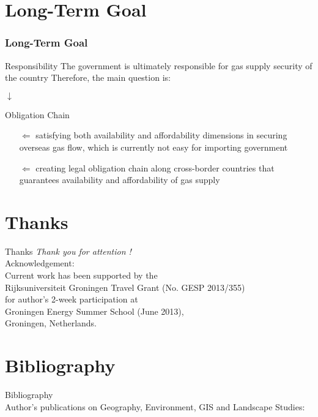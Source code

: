 \documentclass[pdflatex,compress,10pt,
	xcolor={dvipsnames,dvipsnames,svgnames,x11names,table},
	hyperref={
	colorlinks = true,
	breaklinks = true, 
	citecolor=NavyBlue, 
	urlcolor = blue, 
	filecolor=magenta} 
]{beamer}
\begin{document}
\section{Long-Term Goal}
\begin{frame}\frametitle{Long-Term Goal}

\begin{alertblock}{Responsibility}
The government is ultimately responsible for gas supply security of the country
Therefore, the main question is:
\end{alertblock}

$\downarrow$

\begin{examples}{Obligation Chain}
\begin{itemize}
	\item [$\Leftarrow$] satisfying both availability and affordability
dimensions in securing overseas gas flow, which is currently not easy for importing government
	\item [$\Leftarrow$] creating legal obligation chain along cross-border countries that guarantees availability and affordability of gas supply
\end{itemize}
\end{examples}
\end{frame}

\section{Thanks}
\begin{frame}{Thanks}
  	\centering \LARGE 
	\emph{Thank you for attention !}\\
	\vspace{5em}
\small
Acknowledgement: \\
Current work has been supported by the \\
Rijksuniversiteit Groningen Travel Grant (No. GESP 2013/355)\\
for author's 2-week participation at \\
Groningen Energy Summer School (June 2013),\\
Groningen, Netherlands.
\end{frame}

\section{Bibliography}
\Large{Bibliography}\\
\footnotesize{Author's publications on Geography, Environment, GIS and Landscape Studies:}
\vspace{1em}
\nocite{*}
\printbibliography[heading=none]
\end{document}
